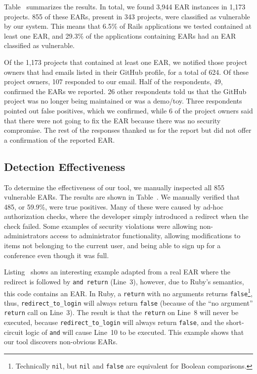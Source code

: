 Table~ summarizes the results. In total, we
found 3,944 EAR instances in 1,173 projects. 855 of these EARs,
present in 343 projects, were classified as vulnerable by our system. This means
that 6.5\% of Rails applications we tested contained at least one EAR,
and 29.3\% of the applications containing EARs had an EAR classified as
vulnerable.

Of the 1,173 projects that contained at least one EAR, we notified those
project owners that had emails listed in their GitHub profile, for a total
of 624. Of these project owners, 107 responded to our email. Half of the
respondents, 49, confirmed the EARs we reported. 26 other respondents told
us that the GitHub project was no longer being maintained or was a
demo/toy. Three respondents pointed out false positives, which we
confirmed, while 6 of the project owners said that there were not going to
fix the EAR because there was no security compromise. The rest of the
responses thanked us for the report but did not offer a confirmation of the
reported EAR. 

\subsection{Detection Effectiveness}


To determine the effectiveness of our tool, we manually inspected all
855 vulnerable EARs. The results are shown in
Table~. We manually verified that 485, or
59.9\%, were true positives. Many of these were caused by ad-hoc
authorization checks, where the developer simply introduced a redirect
when the check failed. Some examples of security violations 
were allowing non-administrators access to administrator
functionality, allowing modifications to items not belonging to the
current user, and being able to sign up for a conference even though
it was full.



Listing~ shows
an interesting example adapted from a real EAR where the redirect is followed by \texttt{and return} (Line~3),
however, due to Ruby's semantics, this code contains an EAR. In Ruby,
a \texttt{return} with no arguments returns \texttt{false}\footnote{Technically
  \texttt{nil}, but \texttt{nil} and \texttt{false} are equivalent for
  Boolean comparisons.}, 
thus, \texttt{redirect\_to\_login} will always return \texttt{false} (because of
the ``no argument'' \texttt{return} call on Line~3). The result is that the
\texttt{return} on Line~8 will never be executed, because
\texttt{redirect\_to\_login} will always return \texttt{false}, and
the short-circuit logic of \texttt{and} will cause Line~10 to be
executed. This example shows that our tool discovers non-obvious EARs.

